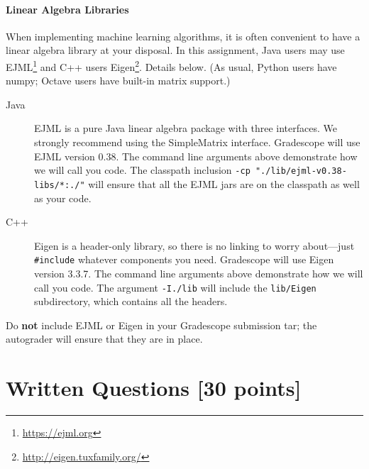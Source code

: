 \documentclass[11pt]{exam}
\numberwithin{equation}{section} %
\numberwithin{figure}{section} %
\numberwithin{table}{section} %
\begin{document}
\begin{notebox}
\paragraph{Linear Algebra Libraries} When implementing machine learning algorithms, it is often convenient to have a linear algebra library at your disposal. In this assignment, Java users may use EJML\footnote{\url{https://ejml.org}} and C++ users Eigen\footnote{\url{http://eigen.tuxfamily.org/}}. Details below. 
%
(As usual, Python users have numpy; Octave users have built-in matrix support.)
%
\begin{description}
\item[Java] EJML is a pure Java linear algebra package with three interfaces. We strongly recommend using the SimpleMatrix interface. Gradescope will use EJML version 0.38. The command line arguments above demonstrate how we will call you code. The classpath inclusion \lstinline{-cp "./lib/ejml-v0.38-libs/*:./"} will ensure that all the EJML jars are on the classpath as well as your code. 
\item[C++] Eigen is a header-only library, so there is no linking to worry about---just \lstinline{#include} whatever components you need. Gradescope will use Eigen version 3.3.7. The command line arguments above demonstrate how we will call you code. The argument \lstinline{-I./lib} will include the \lstinline{lib/Eigen} subdirectory, which contains all the headers.
\end{description} 
Do {\bf not} include EJML or Eigen in your Gradescope submission tar; the autograder will ensure that they are in place. 
\end{notebox}


\clearpage

\section{Written Questions [30 points]}
\label{sec:written}
\end{document}

